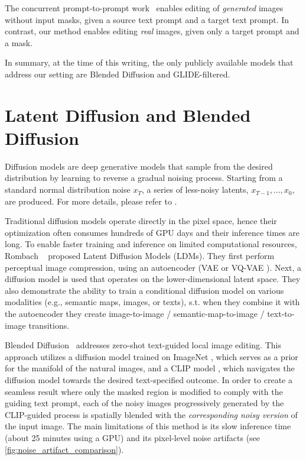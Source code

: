 The concurrent prompt-to-prompt work~\cite{hertz2022prompt} enables editing of \emph{generated} images without input masks, given a source text prompt and a target text prompt. In contrast, our method enables editing \emph{real} images, given only a target prompt and a mask.

In summary, at the time of this writing, the only publicly available models that address our setting are Blended Diffusion and GLIDE-filtered.

\section{Latent Diffusion and Blended Diffusion}
\label{sec:preliminaries}

Diffusion models are deep generative models that sample from the desired distribution by learning to reverse a gradual noising process. Starting from a standard normal distribution noise $x_T$, a series of less-noisy latents, $x_{T-1}, ..., x_0$, are produced. For more details, please refer to \cite{ho2020denoising,nichol2021improved}.

Traditional diffusion models operate directly in the pixel space, hence their optimization often consumes hundreds of GPU days and their inference times are long. To enable faster training and inference on limited computational resources, Rombach \etal~ proposed Latent Diffusion Models (LDMs). They first perform perceptual image compression, using an autoencoder (VAE \cite{kingma2013auto} or VQ-VAE \cite{razavi2019generating,van2017neural, esser2021taming}). Next, a diffusion model is used that operates on the lower-dimensional latent space. They also demonstrate the ability to train a conditional diffusion model on various modalities (e.g., semantic maps, images, or texts), s.t. when they combine it with the autoencoder they create image-to-image / semantic-map-to-image / text-to-image transitions.

Blended Diffusion~\cite{avrahami2022blended} addresses zero-shot text-guided local image editing. This approach utilizes a diffusion model trained on ImageNet \cite{deng2009imagenet}, which serves as a prior for the manifold of the natural images, and a CLIP model \cite{radford2021learning}, which navigates the diffusion model towards the desired text-specified outcome. In order to create a seamless result where only the masked region is modified to comply with the guiding text prompt, each of the noisy images progressively generated by the CLIP-guided process is spatially blended with the \emph{corresponding noisy version} of the input image. The main limitations of this method is its slow inference time (about 25 minutes using a GPU) and its pixel-level noise artifacts (see \ref{fig:noise_artifact_comparison}).

